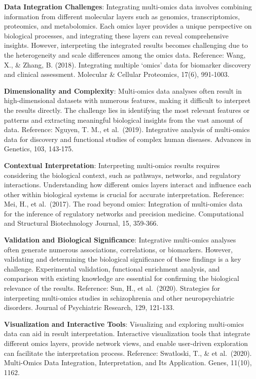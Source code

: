 \documentclass[a4paper, nobind]{templates/ociamthesis}
\begin{document}
\textbf{Data Integration Challenges}: Integrating multi-omics data involves combining information from different molecular layers such as genomics, transcriptomics, proteomics, and metabolomics. Each omics layer provides a unique perspective on biological processes, and integrating these layers can reveal comprehensive insights. However, interpreting the integrated results becomes challenging due to the heterogeneity and scale differences among the omics data. Reference: Wang, X., \& Zhang, B. (2018). Integrating multiple `omics' data for biomarker discovery and clinical assessment. Molecular \& Cellular Proteomics, 17(6), 991-1003.

\textbf{Dimensionality and Complexity}: Multi-omics data analyses often result in high-dimensional datasets with numerous features, making it difficult to interpret the results directly. The challenge lies in identifying the most relevant features or patterns and extracting meaningful biological insights from the vast amount of data. Reference: Nguyen, T. M., et al.~(2019). Integrative analysis of multi-omics data for discovery and functional studies of complex human diseases. Advances in Genetics, 103, 143-175.

\textbf{Contextual Interpretation}: Interpreting multi-omics results requires considering the biological context, such as pathways, networks, and regulatory interactions. Understanding how different omics layers interact and influence each other within biological systems is crucial for accurate interpretation. Reference: Mei, H., et al.~(2017). The road beyond omics: Integration of multi-omics data for the inference of regulatory networks and precision medicine. Computational and Structural Biotechnology Journal, 15, 359-366.

\textbf{Validation and Biological Significance}: Integrative multi-omics analyses often generate numerous associations, correlations, or biomarkers. However, validating and determining the biological significance of these findings is a key challenge. Experimental validation, functional enrichment analysis, and comparison with existing knowledge are essential for confirming the biological relevance of the results. Reference: Sun, H., et al.~(2020). Strategies for interpreting multi-omics studies in schizophrenia and other neuropsychiatric disorders. Journal of Psychiatric Research, 129, 121-133.

\textbf{Visualization and Interactive Tools}: Visualizing and exploring multi-omics data can aid in result interpretation. Interactive visualization tools that integrate different omics layers, provide network views, and enable user-driven exploration can facilitate the interpretation process. Reference: Swatloski, T., \& et al.~(2020). Multi-Omics Data Integration, Interpretation, and Its Application. Genes, 11(10), 1162.
\end{document}
